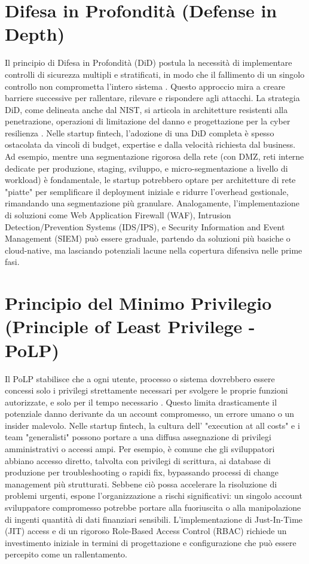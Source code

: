 \section{Difesa in Profondità (Defense in Depth)}
Il principio di Difesa in Profondità (DiD) postula la necessità di implementare controlli di sicurezza multipli e stratificati, in modo che il fallimento di un singolo controllo non comprometta l'intero sistema \cite{NIST_SP_800_53}. Questo approccio mira a creare barriere successive per rallentare, rilevare e rispondere agli attacchi. La strategia DiD, come delineata anche dal NIST, si articola in architetture resistenti alla penetrazione, operazioni di limitazione del danno e progettazione per la cyber resilienza \cite{NIST_SP_800_172}.
Nelle startup fintech, l'adozione di una DiD completa è spesso ostacolata da vincoli di budget, expertise e dalla velocità richiesta dal business. Ad esempio, mentre una segmentazione rigorosa della rete (con DMZ, reti interne dedicate per produzione, staging, sviluppo, e micro-segmentazione a livello di workload) è fondamentale, le startup potrebbero optare per architetture di rete "piatte" per semplificare il deployment iniziale e ridurre l'overhead gestionale, rimandando una segmentazione più granulare. Analogamente, l'implementazione di soluzioni come Web Application Firewall (WAF), Intrusion Detection/Prevention Systems (IDS/IPS), e Security Information and Event Management (SIEM) può essere graduale, partendo da soluzioni più basiche o cloud-native, ma lasciando potenziali lacune nella copertura difensiva nelle prime fasi.

\section{Principio del Minimo Privilegio (Principle of Least Privilege - PoLP)}
Il PoLP stabilisce che a ogni utente, processo o sistema dovrebbero essere concessi solo i privilegi strettamente necessari per svolgere le proprie funzioni autorizzate, e solo per il tempo necessario \cite{NIST_Glossary}. Questo limita drasticamente il potenziale danno derivante da un account compromesso, un errore umano o un insider malevolo.
Nelle startup fintech, la cultura dell' "execution at all costs" e i team "generalisti" possono portare a una diffusa assegnazione di privilegi amministrativi o accessi ampi. Per esempio, è comune che gli sviluppatori abbiano accesso diretto, talvolta con privilegi di scrittura, ai database di produzione per troubleshooting o rapidi fix, bypassando processi di change management più strutturati. Sebbene ciò possa accelerare la risoluzione di problemi urgenti, espone l'organizzazione a rischi significativi: un singolo account sviluppatore compromesso potrebbe portare alla fuoriuscita o alla manipolazione di ingenti quantità di dati finanziari sensibili. L'implementazione di Just-In-Time (JIT) access e di un rigoroso Role-Based Access Control (RBAC) richiede un investimento iniziale in termini di progettazione e configurazione che può essere percepito come un rallentamento.

